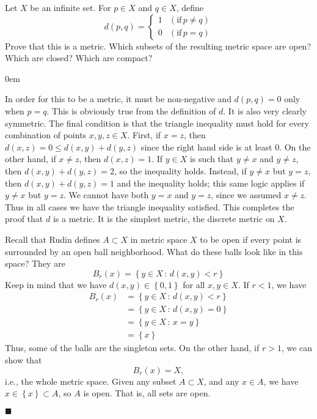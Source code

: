 \documentclass[12pt]{article}
\renewcommand{\qed}{\hfill$\blacksquare$}
\renewenvironment{proof}{\begin{addmargin}[1em]{0em}\begin{newproof}}{\end{newproof}\end{addmargin}\qed}
\newenvironment{problem}[2][Exercise]{\begin{trivlist}
\item[\hskip \labelsep {\bfseries #1}\hskip \labelsep {\bfseries #2.}]}{\end{trivlist}}
\begin{document}
\begin{problem}{2.10}
Let $X$ be an infinite set. For $p\in X$ and $q\in X$, define
\begin{equation*}
 d\left(p,q\right) = \left\{ \begin{array}{lr} 1 & \left(\text{if}\, p\neq q\right) \\ 0 & \left(\text{if}\, p=q\right) \end{array} \right.
\end{equation*}
Prove that this is a metric. Which subsets of the resulting metric space are open? Which are closed? Which are compact?
\end{problem}

\begin{proof}
In order for this to be a metric, it must be non-negative and $d\left(p,q\right) = 0$ only when $p=q$. This is obviously true from the definition of $d$. It is also very clearly symmetric. The final condition is that the triangle inequality must hold for every combination of points $x,y,z \in X$. First, if $x=z$, then $d\left(x,z\right) =0 \leq d\left(x,y\right) + d\left(y,z\right)$ since the right hand side is at least $0$. On the other hand, if $x\neq z$, then $d\left(x,z\right)=1$. If $y\in X$ is such that $y\neq x$ and $y\neq z$, then $d\left(x,y\right) + d\left(y,z\right) = 2$, so the inequality holds. Instead, if $y\neq x$ but $y=z$, then $d\left(x,y\right) + d\left(y,z\right) = 1$ and the inequality holds; this same logic applies if $y\neq x$ but $y=z$. We cannot have both $y=x$ and $y=z$, since we assumed $x\neq z$. Thus in all cases we have the triangle inequality satisfied. This completes the proof that $d$ is a metric. {\color{red}It is the simplest metric, the discrete metric on $X$.}

Recall that Rudin defines $A\subset X$ in metric space $X$ to be open if every point is surrounded by an open ball neighborhood. What do these balls look like in this space? They are $$ B_r\left(x\right) = \left\{ y \in X \, : \, d\left(x,y\right)<r \right\} $$ Keep in mind that we have $d\left(x,y\right) \in \left\{0,1\right\}$ for all $x,y\in X$. If $r<1$, we have 
\begin{align*}
B_r\left(x\right) & = \left\{ y\in X \, : \, d\left(x,y\right) < r \right\} \\
& = \left\{ y \in X \, : \, d\left(x,y\right) = 0\right\} \\
& = \left\{ y\in X \, : \, x=y\right\} \\
& = \left\{ x \right\}
\end{align*}
Thus, some of the balls are the singleton sets. On the other hand, if $r>1$, we can show that $$ B_r\left(x\right) = X,$$ i.e., the whole metric space. Given any subset $A\subset X$, and any $x\in A$, we have $x \in \left\{x\right\} \subset A$, so $A$ is open. That is, all sets are open.


\end{proof}
\end{document}
